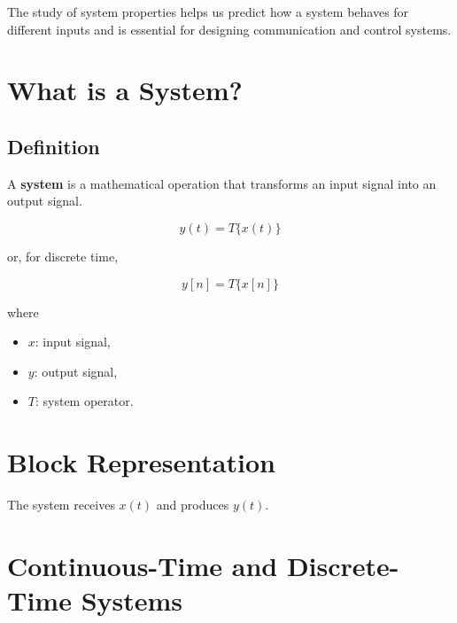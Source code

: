The study of system properties helps us predict how a system behaves for
different inputs and is essential for designing communication and control
systems.


\section{What is a System?}

\subsection{Definition}

A \textbf{system} is a mathematical operation that transforms an input signal
into an output signal.

\[
\boxed{
y(t)=T\{x(t)\}
}
\]

or, for discrete time,

\[
\boxed{
y[n]=T\{x[n]\}
}
\]

where

\begin{itemize}
\item \(x\): input signal,
\item \(y\): output signal,
\item \(T\): system operator.
\end{itemize}


\section{Block Representation}

\begin{center}
\end{center}

The system receives \(x(t)\) and produces \(y(t)\).


\section{Continuous-Time and Discrete-Time Systems}

